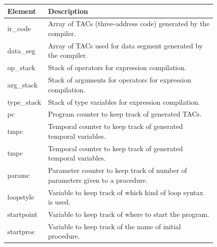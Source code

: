 \begin{figure}[H]
    \centering
    \begin{tabular}{p{1in}p{3in}}
        \toprule
        \textbf{Element} & \textbf{Description}\\
        \midrule ir\_code &
        Array of TACs (three-address code) generated by the compiler.\\

        \midrule data\_seg &
        Array of TACs used for data segment generated by the compiler.\\

        \midrule op\_stack &
        Stack of operators for expression compilation.\\

        \midrule arg\_stack &
        Stack of arguments for operators for expression compilation.\\

        \midrule type\_stack &
        Stack of type variables for expression compilation.\\

        \midrule pc &
        Program counter to keep track of generated TACs.\\

        \midrule tmpc &
        Temporal counter to keep track of generated \newline temporal variables.\\

        \midrule tmpc &
        Temporal counter to keep track of generated \newline temporal variables.\\

        \midrule paramc &
        Parameter counter to keep track of number of \newline parameters given
        to a procedure.\\

        \midrule loopstyle &
        Variable to keep track of which kind of loop syntax is used.\\

        \midrule startpoint &
        Variable to keep track of where to start the \newline program.\\

        \midrule startproc &
        Variable to keep track of the name of initial \newline procedure.\\


\end{tabular}
\end{figure}
